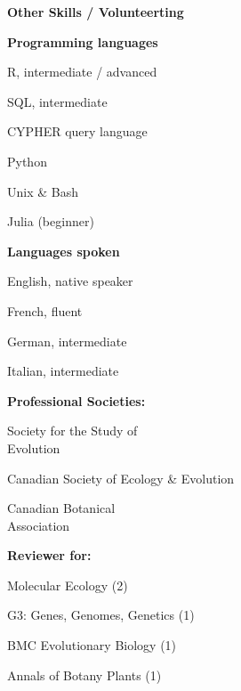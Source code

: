 \documentclass[a4paper,12pt,final]{memoir}
\newcommand{\Sep}{\vspace{1.5em}}
\newcommand{\SmallSep}{\vspace{0.5em}}
\newenvironment{Contact Information}
	{\ignorespaces\textbf{\color{MidnightBlue} Contact Information}}
	{\Sep\ignorespacesafterend}
\newcommand{\CVSection}[1]
	{\Large\textbf{#1}\par
	\SmallSep\normalsize\normalfont}
\newcommand{\CVItem}[1]
	{\textbf{\color{MidnightBlue} #1}}
\begin{document}
\CVSection{Other Skills / Volunteerting}


\CVItem{Programming languages}
\begin{multicols}{3}
\begin{compactitem}[\color{MidnightBlue}$\circ$]
	\item R, intermediate / advanced
    \item SQL, intermediate
    \item CYPHER query language
    \item Python
    \item Unix \& Bash
    \item Julia (beginner) 
\end{compactitem}
\end{multicols}
\Sep 

\CVItem{Languages spoken}
\begin{multicols}{3}
\begin{compactitem}[\color{MidnightBlue}$\circ$]
	\item English, native speaker
	\item French, fluent 
    \item German, intermediate
    \item Italian, intermediate
\end{compactitem}
\end{multicols}
\Sep

\CVItem{Professional Societies:}
\begin{multicols}{3}
\begin{compactitem}[\color{MidnightBlue}$\circ$]
	\item Society for the Study of\\ Evolution
	\item Canadian Society of Ecology \& Evolution
    \item Canadian Botanical\\ Association
\end{compactitem}
\end{multicols}
\Sep

\CVItem{Reviewer for:}
\begin{multicols}{2}
\begin{compactitem}[\color{MidnightBlue}$\circ$]
	\item Molecular Ecology (2)
	\item G3: Genes, Genomes, Genetics (1)
    \item BMC Evolutionary Biology (1)
    \item Annals of Botany Plants (1)
\end{compactitem}
\end{multicols}
\SmallSep
\end{document}

